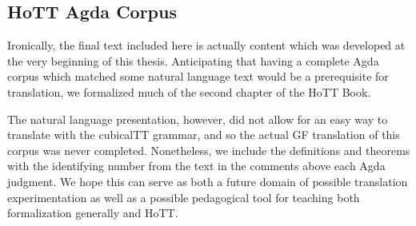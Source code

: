 



\subsection{HoTT Agda Corpus} \label{hottproofs}

Ironically, the final text included here is actually content which was developed
at the very beginning of this thesis. Anticipating that having a complete Agda
corpus which matched some natural language text would be a prerequisite for
translation, we formalized much of the second chapter of the HoTT Book.

The natural language presentation, however, did not allow for an easy way to
translate with the cubicalTT grammar, and so the actual GF translation of this
corpus was never completed. Nonetheless, we include the definitions and theorems
with the identifying number from the text in the comments above each Agda
judgment. We hope this can serve as both a future domain of possible translation
experimentation as well as a possible pedagogical tool for teaching both
formalization generally and HoTT.

